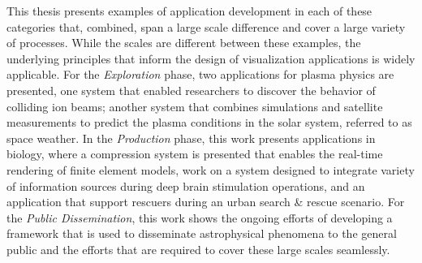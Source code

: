 This thesis presents examples of application development in each of these categories that, combined, span a large scale difference and cover a large variety of processes.  While the scales are different between these examples, the underlying principles that inform the design of visualization applications is widely applicable.  For the \emph{Exploration} phase, two applications for plasma physics are presented, one system that enabled researchers to discover the behavior of colliding ion beams; another system that combines simulations and satellite measurements to predict the plasma conditions in the solar system, referred to as space weather.  In the \emph{Production} phase, this work presents applications in biology, where a compression system is presented that enables the real-time rendering of finite element models, work on a system designed to integrate variety of information sources during deep brain stimulation operations, and an application that support rescuers during an urban search \& rescue scenario.  For the \emph{Public Dissemination}, this work shows the ongoing efforts of developing a framework that is used to disseminate astrophysical phenomena to the general public and the efforts that are required to cover these large scales seamlessly.